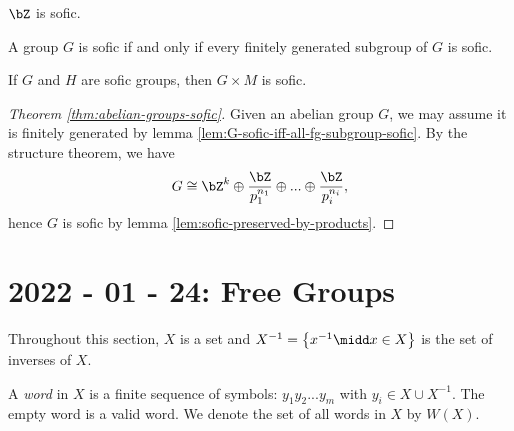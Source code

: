\begin{lem}\label{lem:int-is-sofic}
	$\bZ$ is sofic.
\end{lem}

\begin{lem}\label{lem:G-sofic-iff-all-fg-subgroup-sofic}
	A group $G$ is sofic if and only if every finitely generated subgroup of $G$ is sofic.
\end{lem}

\begin{lem}\label{lem:sofic-preserved-by-products}
	If $G$ and $H$ are sofic groups, then $G\times M$ is sofic.
\end{lem}

\begin{proof}[Theorem \ref{thm:abelian-groups-sofic}]
	Given an abelian group $G$, we may assume it is finitely generated by lemma \ref{lem:G-sofic-iff-all-fg-subgroup-sofic}. By the structure theorem, we have
	\begin{align*}
		G \cong \bZ^k \oplus \frac{\bZ}{p_1^{n_1}} \oplus ... \oplus \frac{\bZ}{p_i^{n_i}},
	\end{align*}
	hence $G$ is sofic by lemma \ref{lem:sofic-preserved-by-products}.
\end{proof}

\section{2022 - 01 - 24: Free Groups}
Throughout this section, $X$ is a set and $X^{-1} = \left\{x^{-1} \midd x \in X\right\}$ is the set of inverses of $X$. 

\begin{defn}\label{def:word}
	A \emph{word} in $X$ is a finite sequence of symbols:  $y_1y_2...y_m$ with $y_i \in X\cup X^{-1}$. The empty word is a valid word. We denote the set of all words in $X$ by $W(X)$. 
\end{defn}


